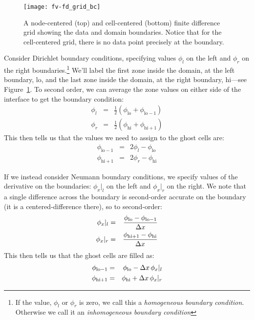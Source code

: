 \begin{figure}[h]
\centering
\texttt{[image: fv-fd\_grid\_bc]}
\caption[Node-centered vs.\ cell-centered data at boundaries]{\label{mg:fig:bcs} 
  A node-centered (top) and cell-centered (bottom) finite difference
  grid showing the data and domain boundaries.  Notice that for the 
  cell-centered grid, there is no data point precisely at the boundary.}
\end{figure}

Consider Dirichlet boundary conditions, specifying values $\phi_l$ on
the left and $\phi_r$ on the right boundaries.\footnote{If the value,
  $\phi_l$ or $\phi_r$ is zero, we call this a {\em homogeneous
    boundary condition}.  Otherwise we call it an {\em inhomogeneous
    boundary condition}} We'll label the first zone inside the domain,
at the left boundary, $\mathrm{lo}$, and the last zone inside the
domain, at the right boundary, $\mathrm{hi}$---see
Figure~\ref{mg:fig:bcs}.  To second order, we can average the zone values on 
either side of the interface to get the boundary condition:
\begin{eqnarray}
\phi_l &=& \frac{1}{2} ( \phi_\mathrm{lo} + \phi_\mathrm{lo-1} ) \\
\phi_r &=& \frac{1}{2} ( \phi_\mathrm{hi} + \phi_\mathrm{hi+1} )
\end{eqnarray}
This then tells us that the values we need to assign to the ghost cells are:
\begin{eqnarray}
\label{eq:bc_inhomo_dir}
\phi_\mathrm{lo-1} &=& 2 \phi_l - \phi_\mathrm{lo} \\
\phi_\mathrm{hi+1} &=& 2 \phi_r - \phi_\mathrm{hi}
\end{eqnarray}

If we instead consider Neumann boundary conditions, we specify values
of the derivative on the boundaries: $\phi_x |_l$ on the left and
$\phi_x |_r$ on the right.  We note that a single difference across
the boundary is second-order accurate on the boundary (it is a
centered-difference there), so to second-order:
\begin{eqnarray}
\phi_x |_l &=& \frac{\phi_\mathrm{lo} - \phi_\mathrm{lo-1}}{\Delta x} \\
\phi_x |_r &=& \frac{\phi_\mathrm{hi+1} - \phi_\mathrm{hi}}{\Delta x}
\end{eqnarray}
This then tells us that the ghost cells are filled as:
\begin{eqnarray}
\label{eq:bc_inhomo_neum}
\phi_\mathrm{lo-1} &=& \phi_\mathrm{lo} - \Delta x \, \phi_x |_l \\
\phi_\mathrm{hi+1} &=& \phi_\mathrm{hi} + \Delta x \, \phi_x |_r
\end{eqnarray}


